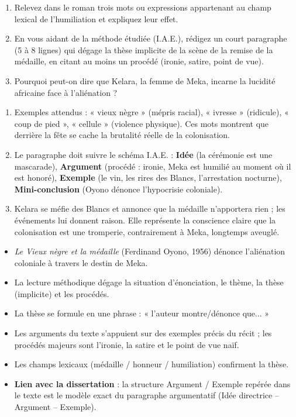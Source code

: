 \documentclass[11pt]{article}
\begin{document}
\begin{exercice}
\begin{enumerate}
\item Relevez dans le roman trois mots ou expressions appartenant au champ lexical de l'humiliation et expliquez leur effet.
\item En vous aidant de la méthode étudiée (I.A.E.), rédigez un court paragraphe (5 à 8 lignes) qui dégage la thèse implicite de la scène de la remise de la médaille, en citant au moins un procédé (ironie, satire, point de vue).
\item Pourquoi peut-on dire que Kelara, la femme de Meka, incarne la lucidité africaine face à l'aliénation ?
\end{enumerate}
\end{exercice}

\begin{corrige}
\begin{enumerate}
\item Exemples attendus : « vieux nègre » (mépris racial), « ivresse » (ridicule), « coup de pied », « cellule » (violence physique). Ces mots montrent que derrière la fête se cache la brutalité réelle de la colonisation.
\item Le paragraphe doit suivre le schéma I.A.E. : \textbf{Idée} (la cérémonie est une mascarade), \textbf{Argument} (procédé : ironie, Meka est humilié au moment où il est honoré), \textbf{Exemple} (le vin, les rires des Blancs, l'arrestation nocturne), \textbf{Mini-conclusion} (Oyono dénonce l'hypocrisie coloniale).
\item Kelara se méfie des Blancs et annonce que la médaille n'apportera rien ; les événements lui donnent raison. Elle représente la conscience claire que la colonisation est une tromperie, contrairement à Meka, longtemps aveuglé.
\end{enumerate}
\end{corrige}

\begin{aretenir}
\begin{itemize}
\item \emph{Le Vieux nègre et la médaille} (Ferdinand Oyono, 1956) dénonce l'aliénation coloniale à travers le destin de Meka.
\item La lecture méthodique dégage la situation d'énonciation, le thème, la thèse (implicite) et les procédés.
\item La thèse se formule en une phrase : « l'auteur montre/dénonce que... »
\item Les arguments du texte s'appuient sur des exemples précis du récit ; les procédés majeurs sont l'ironie, la satire et le point de vue naïf.
\item Les champs lexicaux (médaille / honneur / humiliation) confirment la thèse.
\item \textbf{Lien avec la dissertation} : la structure Argument / Exemple repérée dans le texte est le modèle exact du paragraphe argumentatif (Idée directrice -- Argument -- Exemple).
\end{itemize}
\end{aretenir}
\end{document}
